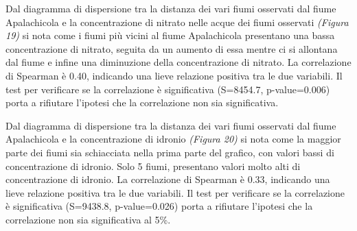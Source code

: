 \documentclass{article} %
\begin{document}
Dal diagramma di dispersione tra la distanza dei vari fiumi osservati dal fiume Apalachicola e la concentrazione di nitrato nelle acque dei fiumi osservati \textit{(Figura 19)} si nota come i fiumi più vicini al fiume Apalachicola presentano una bassa concentrazione di nitrato, seguita da un aumento di essa mentre ci si allontana dal fiume e infine una diminuzione della concentrazione di nitrato.
La correlazione di Spearman è 0.40, indicando una lieve relazione positiva tra le due variabili. 
Il test per verificare se la correlazione è significativa (S=8454.7, p-value=0.006) porta a rifiutare l'ipotesi che la correlazione non sia significativa.

Dal diagramma di dispersione tra la distanza dei vari fiumi osservati dal fiume Apalachicola e la concentrazione di idronio \textit{(Figura 20)} si nota come la maggior parte dei fiumi sia schiacciata nella prima parte del grafico, con valori bassi di concentrazione di idronio. Solo 5 fiumi, presentano valori molto alti di concentrazione di idronio.
La correlazione di Spearman è 0.33, indicando una lieve relazione positiva tra le due variabili. 
Il test per verificare se la correlazione è significativa (S=9438.8, p-value=0.026) porta a rifiutare l'ipotesi che la correlazione non sia significativa al 5\%.
\end{document}
